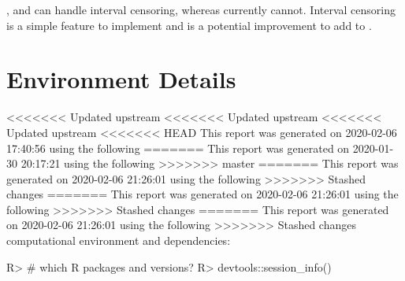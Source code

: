 \documentclass[
]{jss}
\begin{document}
\begin{CodeChunk}
\begin{CodeInput}
,  and  can handle interval
censoring, whereas  currently cannot. Interval censoring
is a simple feature to implement and is a potential improvement to add
to .

\hypertarget{environment-details}{%
\section{Environment Details}\label{environment-details}}

<<<<<<< Updated upstream
<<<<<<< Updated upstream
<<<<<<< Updated upstream
<<<<<<< HEAD
This report was generated on 2020-02-06 17:40:56 using the following
=======
This report was generated on 2020-01-30 20:17:21 using the following
>>>>>>> master
=======
This report was generated on 2020-02-06 21:26:01 using the following
>>>>>>> Stashed changes
=======
This report was generated on 2020-02-06 21:26:01 using the following
>>>>>>> Stashed changes
=======
This report was generated on 2020-02-06 21:26:01 using the following
>>>>>>> Stashed changes
computational environment and dependencies:

\begin{CodeChunk}

\begin{CodeInput}
R> # which R packages and versions?
R> devtools::session_info()
\end{CodeInput}


\end{CodeChunk}
\end{CodeInput}
\end{CodeChunk}
\end{document}
